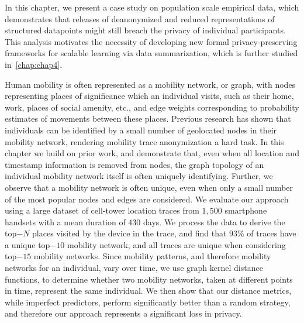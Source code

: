 
In this chapter, we present a case study on population scale empirical data, which demonstrates that releases of deanonymized and reduced representations of structured datapoints might still breach the privacy of individual participants. This analysis motivates the necessity of developing new formal privacy-preserving frameworks for scalable learning via data summarization, which is further studied in~\cref{chap:chap4}.

{Human mobility is often represented as a mobility network, or graph, with nodes representing places of significance which an individual visits, such as their home, work, places of social amenity, etc., and edge weights corresponding to probability estimates of movements between these places.
Previous research has shown that individuals can be identified by a small number of geolocated nodes in their mobility network, rendering mobility trace anonymization a hard task.
In this chapter we build on prior work, and demonstrate that, even when all location and timestamp information is removed from nodes, the graph topology of an individual mobility network itself is often uniquely identifying. 
Further, we observe that a mobility network is often unique, even when only a small number of the most popular nodes and edges are considered. 
We evaluate our approach using a large dataset of cell-tower location traces from $1,500$ smartphone handsets with a mean duration of 430 days.
We process the data to derive the top$-N$ places visited by the device in the trace, and find that $93\%$ of traces have a unique top$-10$ mobility network, and all traces are unique when considering top$-15$ mobility networks.
Since mobility patterns, and therefore mobility networks for an individual, vary over time, we use graph kernel distance functions, to determine whether two mobility networks, taken at different points in time, represent the same individual.
We then show that our distance metrics, while imperfect predictors, perform significantly better than a random strategy, and therefore our approach represents a significant loss in privacy.}

